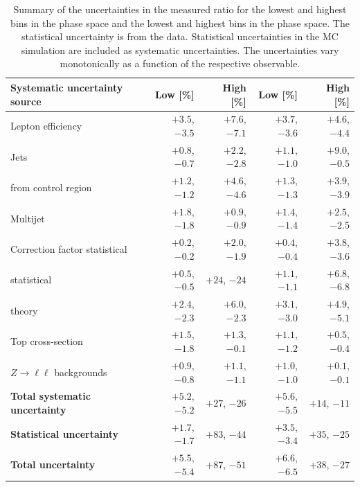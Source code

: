\documentclass[cernpreprint,txfonts,UKenglish,texlive=2016]{\ATLASLATEXPATH atlasdoc}
\begin{document}
\begin{table}
\centering
\caption{\label{tab:systematics} Summary of the uncertainties in the
  measured ratio \Rmiss{} for the lowest and highest \ptmiss{} bins in the
  \onejet{} phase space and the lowest and highest \mjj{} bins in the
  \vbf{} phase space. The statistical uncertainty is from
  the data. Statistical uncertainties in the MC simulation
  are included as systematic uncertainties.
  The uncertainties vary monotonically as a function of the respective observable.}
\begin{tabular}{ l|rrrr} 
 \hline
 \textbf{Systematic uncertainty source}     & Low \ptmiss{} [\%] & High \ptmiss{} [\%]  &
 Low \mjj{} [\%] & High \mjj{} [\%] \\ 
\hline
Lepton efficiency   & $+3.5$,  $-3.5$  & $+7.6$, $-7.1$ & $+3.7$,  $-3.6$  & $+4.6$, $-4.4$\\
Jets                        & $+0.8$,  $-0.7$  & $+2.2$, $-2.8$  &  $+1.1$,  $-1.0$  & $+9.0$, $-0.5$ \\
\Wtaunu{} from control region         & $+1.2$,  $-1.2$  & $+4.6$, $-4.6$  & $+1.3$,  $-1.3$  & $+3.9$, $-3.9$  \\
Multijet                  &  $+1.8$,  $-1.8$  & $+0.9$, $-0.9$  &   $+1.4$,  $-1.4$  & $+2.5$, $-2.5$\\
Correction factor statistical    & $+0.2$,  $-0.2$  & $+2.0$, $-1.9$ & $+0.4$,  $-0.4$  & $+3.8$, $-3.6$  \\
\W{}  statistical            & $+0.5$,  $-0.5$  & $+24$, $-24$   &  $+1.1$,  $-1.1$  & $+6.8$, $-6.8$ \\
\W{} theory         & $+2.4$,  $-2.3$  & $+6.0$, $-2.3$  & $+3.1$,  $-3.0$  & $+4.9$, $-5.1$ \\
Top cross-section  & $+1.5$,  $-1.8$  & $+1.3$, $-0.1$  &  $+1.1$,  $-1.2$  & $+0.5$, $-0.4$   \\
$Z\rightarrow \ell\ell$ backgrounds & $+0.9$,  $-0.8$  & $+1.1$, $-1.1$ & $+1.0$,  $-1.0$  & $+0.1$, $-0.1$ \\ 
\hline
\textbf{Total systematic uncertainty}               & $+5.2$, $-5.2$ & $+27$, $-26$   & $+5.6$, $-5.5$ & $+14$, $-11$   \\
\hline
\textbf{Statistical uncertainty}                   & $+1.7$, $-1.7$ & $+83$, $-44$   &  $+3.5$, $-3.4$ & $+35$, $-25$  \\    
\hline
 \textbf{Total uncertainty}   & $+5.5$, $-5.4$ & $+87$, $-51$  & $+6.6$, $-6.5$ & $+38$, $-27$  \\    
\hline
\end{tabular}
\end{table}
\end{document}
